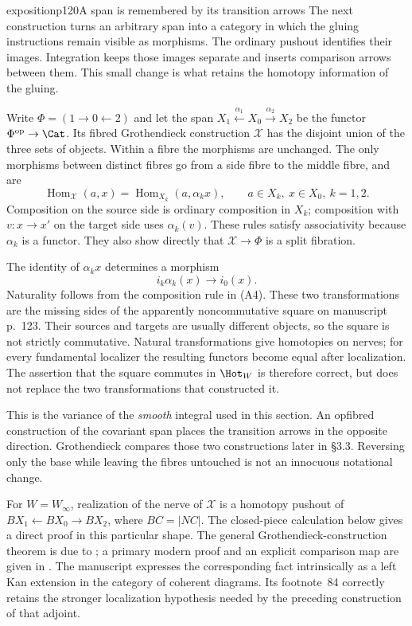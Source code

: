 \begin{dcomment}{exposition}{p120}{A span is remembered by its transition arrows}
The next construction turns an arbitrary span into a category in which the gluing instructions remain visible as morphisms.  The ordinary pushout identifies their images.  Integration keeps those images separate and inserts comparison arrows between them.  This small change is what retains the homotopy information of the gluing.

Write $\Phi=(1\to0\leftarrow2)$ and let the span $X_1\xleftarrow{\alpha_1}X_0\xrightarrow{\alpha_2}X_2$ be the functor $\Phi^{\mathrm{op}}\to\Cat$.  Its fibred Grothendieck construction $\mathcal X$ has the disjoint union of the three sets of objects.  Within a fibre the morphisms are unchanged.  The only morphisms between distinct fibres go from a side fibre to the middle fibre, and are
\[
 \operatorname{Hom}_{\mathcal X}(a,x)
     =\operatorname{Hom}_{X_k}(a,\alpha_kx),
 \qquad a\in X_k,\ x\in X_0,\ k=1,2.
 \tag{A4}
\]
Composition on the source side is ordinary composition in $X_k$; composition with $v:x\to x'$ on the target side uses $\alpha_k(v)$.  These rules satisfy associativity because $\alpha_k$ is a functor.  They also show directly that $\mathcal X\to\Phi$ is a split fibration.

The identity of $\alpha_kx$ determines a morphism
\[
 i_k\alpha_k(x)\longrightarrow i_0(x).
\]
Naturality follows from the composition rule in (A4).  These two transformations are the missing sides of the apparently noncommutative square on manuscript p.~123.  Their sources and targets are usually different objects, so the square is not strictly commutative.  Natural transformations give homotopies on nerves; for every fundamental localizer the resulting functors become equal after localization.  The assertion that the square commutes in $\Hot_W$ is therefore correct, but does not replace the two transformations that constructed it.

This is the variance of the \emph{smooth} integral used in this section.  An opfibred construction of the covariant span places the transition arrows in the opposite direction.  Grothendieck compares those two constructions later in \S3.3.  Reversing only the base while leaving the fibres untouched is not an innocuous notational change.

For $W=W_\infty$, realization of the nerve of $\mathcal X$ is a homotopy pushout of $BX_1\leftarrow BX_0\to BX_2$, where $BC=|NC|$.  The closed-piece calculation below gives a direct proof in this particular shape.  The general Grothendieck-construction theorem is due to \citet[Theorem~1.2]{Thomason1979}; a primary modern proof and an explicit comparison map are given in \citet[\S3, equation~(9) and Theorem~3]{Cegarra2020}.  The manuscript expresses the corresponding fact intrinsically as a left Kan extension in the category of coherent diagrams.  Its footnote~84 correctly retains the stronger localization hypothesis needed by the preceding construction of that adjoint.
\end{dcomment}

